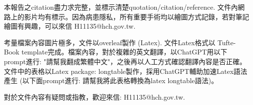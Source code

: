 \documentclass[nols]{tufte-book}
\begin{document}
本報告之citation盡力求完整，並標示清楚quotation/citation/reference. 文件內網路上的影片均有標示。因為病患隱私，所有重要手術均以繪圖方式記錄，若對筆記繪圖有興趣，可以來信 H11135@hch.gov.tw. 

考量檔案內容圖片極多，文件以overleaf製作 (Latex). 文件Latex格式以 Tufte-Book template完成。檔案內容，對於複雜的英文翻譯，以ChatGPT用以下prompt進行: "請幫我翻成繁體中文"，之後再以人工方式確認翻譯內容是否正確。文件中的表格以Latex package: longtable製作，採用ChatGPT輔助加速Latex語法產生 (以下面prompt進行: 請幫我將此表格轉換為latex longtable語法)。

對於文件內容有疑問或指教，歡迎來信: H11135@hch.gov.tw. 
\cite{Adamo2019}



\end{document}
